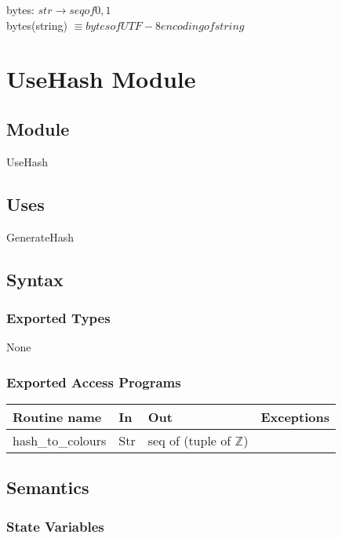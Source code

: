 \documentclass[12pt, titlepage]{article}
\begin{document}
\hspace{-18pt}bytes: $str \rightarrow seq of {0,1}$ \\
bytes(string) $\equiv bytes of UTF-8 encoding of string$ \\

\newpage

\section* {UseHash Module}

\subsection*{Module}

UseHash

\subsection* {Uses}

GenerateHash

\subsection* {Syntax}

\subsubsection* {Exported Types}

None

\subsubsection* {Exported Access Programs}

\begin{tabular}{| l | l | l | l |}
\hline
\textbf{Routine name} & \textbf{In} & \textbf{Out} & \textbf{Exceptions}\\
\hline
hash\_to\_colours & Str & seq of (tuple of $\mathbb{Z}$) & \\
\hline
\end{tabular}

\subsection* {Semantics}

\subsubsection* {State Variables}
\end{document}
